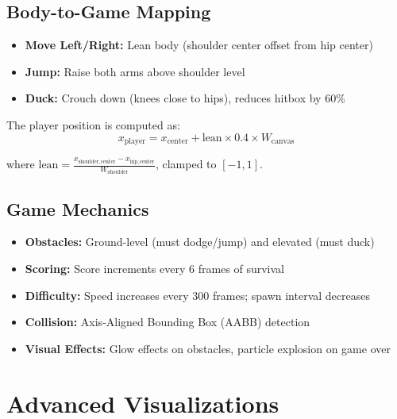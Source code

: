 \documentclass[a4paper,12pt]{report}
\begin{document}
\section{Body-to-Game Mapping}
\begin{itemize}
    \item \textbf{Move Left/Right:} Lean body (shoulder center offset from hip center)
    \item \textbf{Jump:} Raise both arms above shoulder level
    \item \textbf{Duck:} Crouch down (knees close to hips), reduces hitbox by 60\%
\end{itemize}

The player position is computed as:
\begin{equation}
    x_{\text{player}} = x_{\text{center}} + \text{lean} \times 0.4 \times W_{\text{canvas}}
\end{equation}

where $\text{lean} = \frac{x_{\text{shoulder\_center}} - x_{\text{hip\_center}}}{W_{\text{shoulder}}}$, clamped to $[-1, 1]$.

\section{Game Mechanics}
\begin{itemize}
    \item \textbf{Obstacles:} Ground-level (must dodge/jump) and elevated (must duck)
    \item \textbf{Scoring:} Score increments every 6 frames of survival
    \item \textbf{Difficulty:} Speed increases every 300 frames; spawn interval decreases
    \item \textbf{Collision:} Axis-Aligned Bounding Box (AABB) detection
    \item \textbf{Visual Effects:} Glow effects on obstacles, particle explosion on game over
\end{itemize}

\newpage

\chapter{Advanced Visualizations}
\thispagestyle{contentpages}
\justifying
\end{document}
